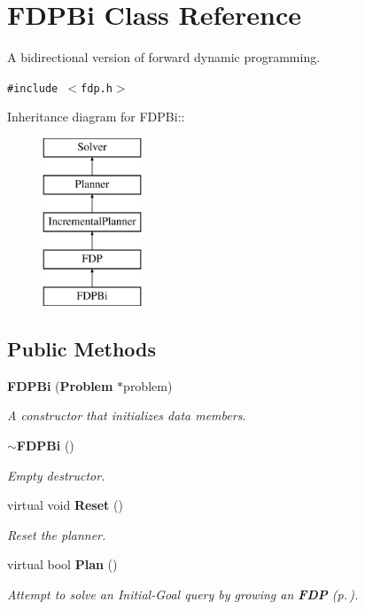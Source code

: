 \section{FDPBi  Class Reference}
\label{classFDPBi}
A bidirectional version of forward dynamic programming. 


{\tt \#include $<$fdp.h$>$}

Inheritance diagram for FDPBi::\begin{figure}[H]
\begin{center}
\leavevmode
\includegraphics[height=5cm]{classFDPBi}
\end{center}
\end{figure}
\subsection*{Public Methods}
\begin{CompactItemize}
\item 
{\bf FDPBi} ({\bf Problem} $\ast$problem)
\begin{CompactList}\small\item\em A constructor that initializes data members.\item\end{CompactList}\item 
{\bf $\sim$FDPBi} ()
\begin{CompactList}\small\item\em Empty destructor.\item\end{CompactList}\item 
virtual void {\bf Reset} ()
\begin{CompactList}\small\item\em Reset the planner.\item\end{CompactList}\item 
virtual bool {\bf Plan} ()
\begin{CompactList}\small\item\em Attempt to solve an Initial-Goal query by growing an {\bf FDP} {\rm (p.\,\pageref{classFDP})}.\item\end{CompactList}\end{CompactItemize}
